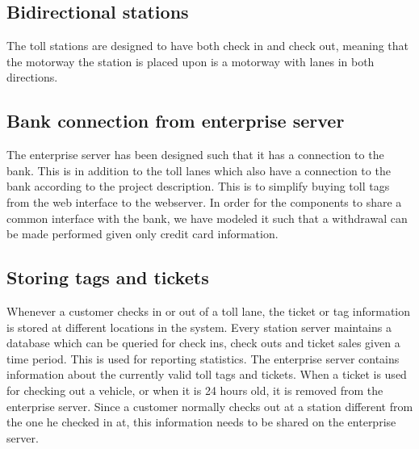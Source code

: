 \subsection{Bidirectional stations}
The toll stations are designed to have both check in and check out, meaning that the motorway the station is placed upon is a motorway with lanes in both directions.

\subsection{Bank connection from enterprise server}
The enterprise server has been designed such that it has a connection to the bank. This is in addition to the toll lanes which also have a connection to the bank according to the project description. This is to simplify buying toll tags from the web interface to the webserver.
In order for the components to share a common interface with the bank, we have modeled it such that a withdrawal can be made performed given only credit card information.

\subsection{Storing tags and tickets}
Whenever a customer checks in or out of a toll lane, the ticket or tag information is stored at different locations in the system. Every station server maintains a database which can be queried for check ins, check outs and ticket sales given a time period. This is used for reporting statistics. The enterprise server contains information about the currently valid toll tags and tickets. When a ticket is used for checking out a vehicle, or when it is 24 hours old, it is removed from the enterprise server. Since a customer normally checks out at a station different from the one he checked in at, this information needs to be shared on the enterprise server.